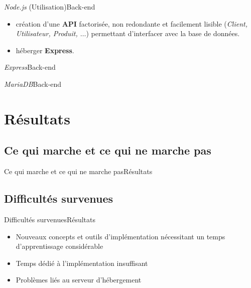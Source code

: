\documentclass[usenames,dvipsnames]{beamer}
\begin{document}
\begin{frame}{\textit{Node.js} (Utilisation)}{Back-end}
  \begin{itemize}
    \item création d'une \textbf{API} factorisée, non redondante et facilement lisible (\textit{Client, Utilisateur, Produit, $\dots$}) permettant d'interfacer avec la base de données.
    \item héberger \textbf{Express}.
  \end{itemize}
\end{frame}

\begin{frame}{\textit{Express}}{Back-end}

\end{frame}

\begin{frame}{\textit{MariaDB}}{Back-end}

\end{frame}
\section{Résultats}
\subsection{Ce qui marche et ce qui ne marche pas}
\begin{frame}{Ce qui marche et ce qui ne marche pas}{Résultats}

\end{frame}

\subsection{Difficultés survenues}
\begin{frame}{Difficultés survenues}{Résultats}
  \begin{itemize}
    \item Nouveaux concepts et outils d'implémentation nécessitant un temps d'apprentissage considérable
    \item Temps dédié à l'implémentation insuffisant
    \item Problèmes liés au serveur d'hébergement
  \end{itemize}
\end{frame}
\end{document}
